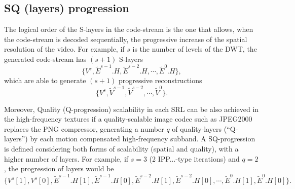 \subsection{SQ (layers) progression}
The logical order of the S-layers in the code-stream is the one that
allows, when the code-stream is decoded sequentially, the progressive
increase of the spatial resolution of the video. For example, if
$s$ is the number of levels of the DWT, the generated
code-stream has $(s+1)$ S-layers
\begin{equation*}
  \{V^s,\tilde{E}^{s-1}.H,\tilde{E}^{s-2}.H,\cdots,\tilde{E}^0.H\},
\end{equation*}
which are able to generate $(s+1)$ progressive
reconstructions
\begin{equation*}
  \{V^s,\tilde{V}^{s-1},\tilde{V}^{s-2},\cdots,\tilde{V}^0\}.
\end{equation*}

Moreover, Quality (Q-progression) scalability in each SRL can be also
achieved in the high-frequency textures if a quality-scalable image
codec such as JPEG2000~\cite{taubman2002jpeg2000} replaces the PNG
compressor, generating a number $q$ of quality-layers (``Q-layers'')
by each motion compensated high-frequency subband. A SQ-progression is
defined considering both forms of scalability (spatial and quality),
with a higher number of layers. For example, if $s=3$ (2 IPP...-type
iterations) and $q=2$, the progression of layers would be
\begin{equation*}
  \{V^s[1],V^s[0],\tilde{E}^{s-1}.H[1],\tilde{E}^{s-1}.H[0],\tilde{E}^{s-2}.H[1],\tilde{E}^{s-2}.H[0],\cdots,\tilde{E}^0.H[1],\tilde{E}^0.H[0]\}.
\end{equation*}


